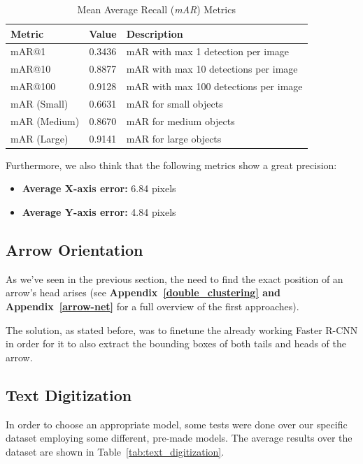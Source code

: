 \documentclass[conference]{IEEEtran}
\begin{document}
\begin{table}[htbp]
	\centering
	\caption{Mean Average Recall (\textit{mAR}) Metrics}
	\label{tab:mar}
	\begin{tabular}{|l|c|l|}
		\hline
		\textbf{Metric} & \textbf{Value} & \textbf{Description} \\
		\hline
		mAR@1 & 0.3436 & mAR with max 1 detection per image \\
		mAR@10 & 0.8877 & mAR with max 10 detections per image \\
		mAR@100 & 0.9128 & mAR with max 100 detections per image \\
		\hline
		mAR (Small) & 0.6631 & mAR for small objects \\
		mAR (Medium) & 0.8670 & mAR for medium objects \\
		mAR (Large) & 0.9141 & mAR for large objects \\
		\hline
	\end{tabular}
\end{table}

Furthermore, we also think that the following metrics show a great precision:

\begin{itemize}
	\item \textbf{Average X-axis error:} 6.84 pixels
	\item \textbf{Average Y-axis error:} 4.84 pixels
\end{itemize}


\subsection{Arrow Orientation}
\label{exp:arrow_orientation}
As we've seen in the previous section, the need to find the exact position of an arrow's head arises (see \textbf{Appendix~\ref{double_clustering} and \textbf{Appendix}~\ref{arrow-net}} for a full overview of the first approaches).

The solution, as stated before, was to finetune the already working Faster R-CNN in order for it to also extract the bounding boxes of both tails and heads of the arrow.

\subsection{Text Digitization}
In order to choose an appropriate model, some tests were done over our specific dataset employing some different, pre-made models. The average results over the dataset are shown in Table~\ref{tab:text_digitization}.
\end{document}
